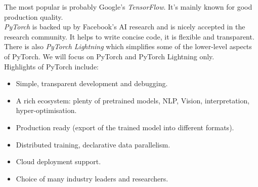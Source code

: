 The most popular is probably Google's \textit{TensorFlow}. It's mainly known for good production quality.\\

\textit{PyTorch} is backed up by Facebook's AI research and is nicely accepted in the research community. It helps to write concise code, it is flexible and transparent. There is also \textit{PyTorch Lightning} which simplifies some of the lower-level aspects of PyTorch. We will focus on PyTorch and PyTorch Lightning only.\\

Highlights of PyTorch include:
\begin{itemize}
\item Simple, transparent development and debugging.
\item A rich ecosystem: plenty of pretrained models, NLP, Vision, interpretation, hyper-optimisation. 
\item Production ready (export of the trained model into different formats).
\item Distributed training, declarative data parallelism.
\item Cloud deployment support.
\item Choice of many industry leaders and researchers.
\end{itemize}



\newpage

